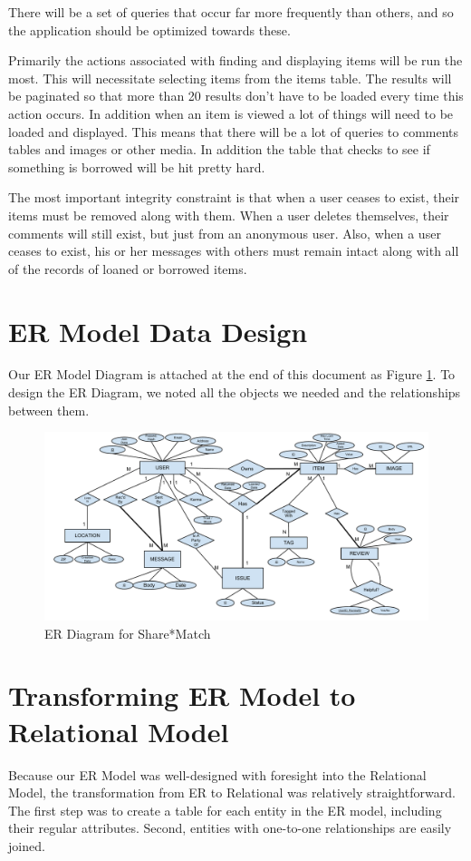 \documentclass{acm_proc_article-sp}
\begin{document}
There will be a set of queries that occur far more frequently than others, and so the application should be optimized towards these.

Primarily the actions associated with finding and displaying items will be run the most. This will necessitate selecting items from the items table. The results will be paginated so that more than 20 results don't have to be loaded every time this action occurs. In addition when an item is viewed a lot of things will need to be loaded and displayed. This means that there will be a lot of queries to comments tables and images or other media. In addition the table that checks to see if something is borrowed will be hit pretty hard.

The most important integrity constraint is that when a user ceases to exist, their items must be removed along with them. When a user deletes themselves, their comments will still exist, but just from an anonymous user. Also, when a user ceases to exist, his or her messages with others must remain intact along with all of the records of loaned or borrowed items.

\section{ER Model Data Design}
Our ER Model Diagram is attached at the end of this document as Figure \ref{fig:ERDiagram}. To design the ER Diagram, we
noted all the objects we needed and the relationships between them.
\begin{figure}[p]
    \includegraphics[width=\textwidth]{EECS341ProjectERDiagram.pdf}
    \caption{ER Diagram for Share*Match}
    \label{fig:ERDiagram}
\end{figure}

\section{Transforming ER Model to Relational Model}
Because our ER Model was well-designed with foresight into the Relational Model, the transformation from ER to Relational was relatively straightforward. The first step was to create a table for each entity in the ER model, including their regular attributes. Second, entities with one-to-one relationships are easily joined.
\end{document}
